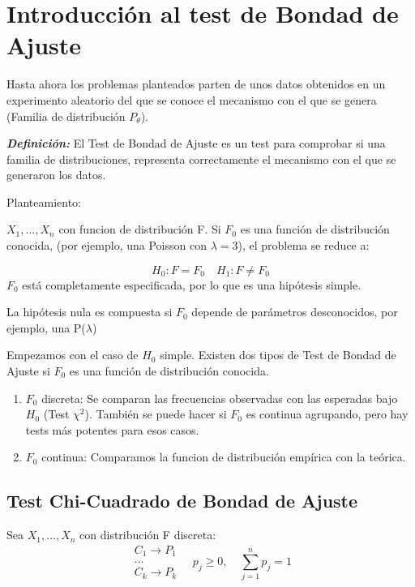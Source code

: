 \section{Introducción al test de Bondad de Ajuste}

Hasta ahora los problemas planteados parten de unos datos obtenidos
en un experimento aleatorio del que se conoce el mecanismo con el que se genera (Familia de distribución $P_\theta$).

\textit{\textbf{Definición: }}El Test de Bondad de Ajuste es un test para comprobar si una familia de distribuciones,
 representa correctamente el mecanismo con el que se generaron los datos.

Planteamiento:

$X_1,\dots,X_n$ con funcion de distribución F. Si $F_0$ es una función de distribución conocida, (por ejemplo, una Poisson con $\lambda=3$), el problema se reduce a:

$$H_0: F=F_0 \quad H_1: F \neq F_0$$
$F_0$ está completamente especificada, por lo que es una hipótesis simple.

La hipótesis nula es compuesta si $F_0$ depende de parámetros desconocidos, por ejemplo, una P($\lambda$)

Empezamos con el caso de $H_0$ simple. Existen dos tipos de Test de Bondad de Ajuste si $F_0$ es una función de  distribución conocida.
\begin{enumerate}
    \item $F_0$ discreta: Se comparan las frecuencias observadas con las esperadas bajo $H_0$ (Test $\chi^2$). También se puede hacer si $F_0$ es continua agrupando, pero hay tests más potentes para esos casos.
    \item $F_0$ continua: Comparamos la funcion de distribución empírica con la teórica.
\end{enumerate}

\subsection{Test Chi-Cuadrado de Bondad de Ajuste} 

Sea $X_1,\dots,X_n$ con distribución F discreta:
\[
\begin{matrix}
    C_1 \to P_1\\
    \dots \\
    C_k \to P_k
\end{matrix}
\quad
p_j \geq 0,
\quad \sum_{j=1}^{n} p_j=1
\]

